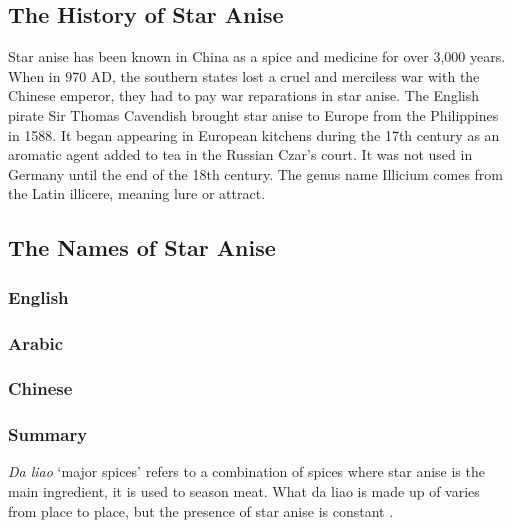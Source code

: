 \subsection{The History of Star Anise}

Star anise has been known in China as a spice and medicine for over 3,000 years. When in 970 AD, the southern states lost a cruel and merciless war with the Chinese emperor, they had to pay war reparations in star anise. The English pirate Sir Thomas Cavendish brought star anise to Europe from the Philippines in 1588. It began appearing in European kitchens during the 17th century as an aromatic agent added to tea in the Russian Czar's court. It was not used in Germany until the end of the 18th century. The genus name Illicium comes from the Latin illicere, meaning lure or attract.


\subsection{The Names of Star Anise}

\subsubsection{English}







\subsubsection{Arabic}



\subsubsection{Chinese}



\subsubsection{Summary}



\textit{Da liao} `major spices' refers to a combination of spices where star anise is the main ingredient, it is used to season meat. What da liao is made up of varies from place to place, but the presence of star anise is constant \autocite[152]{hu_food_2005}.  

